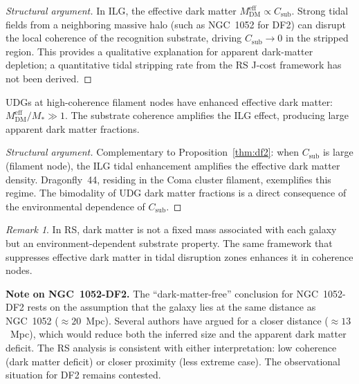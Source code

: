 \documentclass[12pt,a4paper]{article}
\theoremstyle{definition}
\theoremstyle{remark}
\newtheorem{remark}[theorem]{Remark}
\begin{document}
\begin{proof}[Structural argument]
In ILG, the effective dark matter $M_{\mathrm{DM}}^{\mathrm{eff}} \propto
C_{\mathrm{sub}}$.  Strong tidal fields from a neighboring massive halo
(such as NGC~1052 for DF2) can disrupt the local coherence of the
recognition substrate, driving $C_{\mathrm{sub}} \to 0$ in the stripped
region.  This provides a qualitative explanation for apparent
dark-matter depletion; a quantitative tidal stripping rate from the RS
J-cost framework has not been derived.
\end{proof}

\begin{proposition}
\label{thm:df44}
UDGs at high-coherence filament nodes have enhanced effective dark
matter: $M_{\mathrm{DM}}^{\mathrm{eff}}/M_\ast \gg 1$.  The
substrate coherence amplifies the ILG effect, producing large apparent
dark matter fractions.
\end{proposition}

\begin{proof}[Structural argument]
Complementary to Proposition~\ref{thm:df2}: when $C_{\mathrm{sub}}$
is large (filament node), the ILG tidal enhancement amplifies the
effective dark matter density.  Dragonfly~44, residing in the Coma
cluster filament, exemplifies this regime.  The bimodality of UDG
dark matter fractions is a direct consequence of the environmental
dependence of $C_{\mathrm{sub}}$.
\end{proof}

\begin{remark}
In RS, dark matter is not a fixed mass associated with each galaxy
but an environment-dependent substrate property.  The same framework
that suppresses effective dark matter in tidal disruption zones
enhances it in coherence nodes.

\medskip\noindent\textbf{Note on NGC~1052-DF2.}  The ``dark-matter-free''
conclusion for NGC~1052-DF2 rests on the assumption that the galaxy
lies at the same distance as NGC~1052 ($\approx 20$~Mpc).  Several
authors have argued for a closer distance ($\approx 13$~Mpc), which
would reduce both the inferred size and the apparent dark matter deficit.
The RS analysis is consistent with either interpretation: low coherence
(dark matter deficit) or closer proximity (less extreme case).  The
observational situation for DF2 remains contested.
\end{remark}

\end{document}
